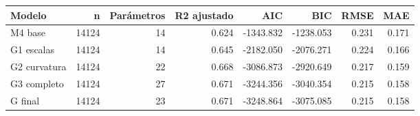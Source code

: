 \begin{tabular}{lrrrrrrr}
\toprule
Modelo & n & Parámetros & R2 ajustado & AIC & BIC & RMSE & MAE \\
\midrule
M4 base & 14124 & 14 & 0.624 & -1343.832 & -1238.053 & 0.231 & 0.171 \\
G1 escalas & 14124 & 14 & 0.645 & -2182.050 & -2076.271 & 0.224 & 0.166 \\
G2 curvatura & 14124 & 22 & 0.668 & -3086.873 & -2920.649 & 0.217 & 0.159 \\
G3 completo & 14124 & 27 & 0.671 & -3244.356 & -3040.354 & 0.215 & 0.158 \\
G final & 14124 & 23 & 0.671 & -3248.864 & -3075.085 & 0.215 & 0.158 \\
\bottomrule
\end{tabular}
